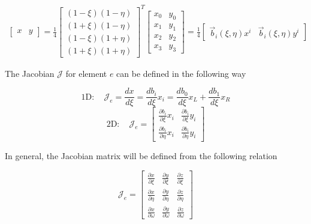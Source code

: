 \documentclass[11pt]{style/memo}
\begin{document}
\begin{eqnarray}
    \begin{bmatrix}
        x & y
    \end{bmatrix} = \frac{1}{4}
    \begin{bmatrix}
        (1-\xi)(1-\eta) \\
        (1+\xi)(1-\eta) \\
        (1-\xi)(1+\eta) \\
        (1+\xi)(1+\eta)
    \end{bmatrix}^T
    \begin{bmatrix}
        x_0 & y_0 \\
        x_1 & y_1 \\
        x_2 & y_2 \\
        x_3 & y_3
    \end{bmatrix}
    = \frac{1}{4}
    \begin{bmatrix}
        \vec{b}_i(\xi,\eta)x^i &
        \vec{b}_i(\xi,\eta)y^i
    \end{bmatrix}
\end{eqnarray}

The Jacobian $\mathcal{J}$ for element $e$ can be defined in the following way

\begin{equation*}
    \mathrm{1D:} \quad \mathcal{J}_e = \frac{dx}{d\xi} = \frac{db_i}{d\xi}x_i = \frac{db_0}{d\xi}x_L + \frac{db_1}{d\xi}x_R
\end{equation*}
\begin{equation*}
    \mathrm{2D:} \quad \mathcal{J}_e = \begin{bmatrix}
        \frac{\partial b_i}{\partial\xi}x_i & \frac{\partial b_i}{\partial\xi}y_i \\
        \frac{\partial b_i}{\partial\eta}x_i & \frac{\partial b_i}{\partial\eta}y_i
    \end{bmatrix}
\end{equation*}

In general, the Jacobian matrix will be defined from the following relation

\begin{equation*}
    \mathcal{J}_e = \begin{bmatrix}
        \frac{\partial x}{\partial\xi} & \frac{\partial y}{\partial\xi} & \frac{\partial z}{\partial\xi} \\
        \frac{\partial x}{\partial\eta} & \frac{\partial y}{\partial\eta} & \frac{\partial z}{\partial\eta} \\
        \frac{\partial x}{\partial\omega} & \frac{\partial y}{\partial\omega} & \frac{\partial z}{\partial\omega}
    \end{bmatrix}
\end{equation*}
\end{document}
